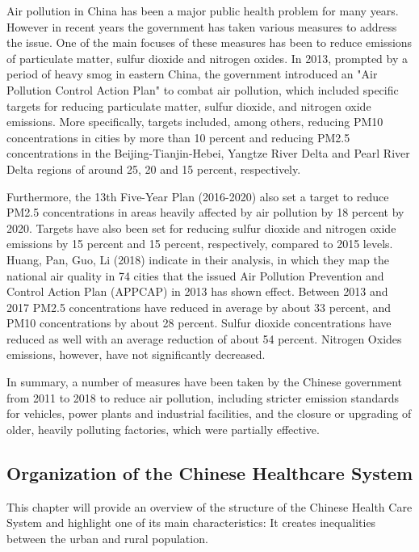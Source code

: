 \documentclass[
]{article}
\begin{document}
Air pollution in China has been a major public health problem for many years. However in recent years the government has taken various measures to address the issue. One of the main focuses of these measures has been to reduce emissions of particulate matter, sulfur dioxide and nitrogen oxides. 
In 2013, prompted by a period of heavy smog in eastern China, the government introduced an "Air Pollution Control Action Plan" to combat air pollution, which included specific targets for reducing particulate matter, sulfur dioxide, and nitrogen oxide emissions. More specifically, targets included, among others, reducing PM10 concentrations in cities by more than 10 percent and reducing PM2.5 concentrations in the Beijing-Tianjin-Hebei, Yangtze River Delta and Pearl River Delta regions of around 25, 20 and 15 percent, respectively. %

Furthermore, the 13th Five-Year Plan (2016-2020) also set a target to reduce PM2.5 concentrations in areas heavily affected by air pollution by 18 percent by 2020. Targets have also been set for reducing sulfur dioxide and nitrogen oxide emissions by 15 percent and 15 percent, respectively, compared to 2015 levels. %
Huang, Pan, Guo, Li (2018) indicate in their analysis, in which they map the national air quality in 74 cities that the issued Air Pollution Prevention and Control Action Plan (APPCAP) in 2013 has shown effect. Between 2013 and 2017 PM2.5 concentrations have reduced in average by about 33 percent, and PM10 concentrations by about 28 percent. Sulfur dioxide concentrations have reduced as well with an average reduction of about 54 percent. Nitrogen Oxides emissions, however, have not significantly decreased. %

In summary, a number of measures have been taken by the Chinese government from 2011 to 2018 to reduce air pollution, including stricter emission standards for vehicles, power plants and industrial facilities, and the closure or upgrading of older, heavily polluting factories, which were partially effective. %

\subsection{Organization of the Chinese Healthcare System}
This chapter will provide an overview of the structure of the Chinese Health Care System and highlight one of its main characteristics: It creates inequalities between the urban and rural population. 
\end{document}
